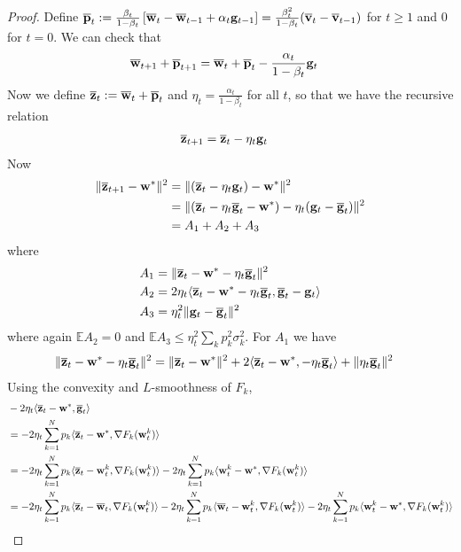 \begin{proof}
	Define ${\overline{\mathbf{p}}}_{t}:=\frac{\beta_{t}}{1-\beta_{t}}\left[{\overline{\mathbf{w}}}_{t}-{\overline{\mathbf{w}}}_{t-1}+\alpha_{t}{\mathbf{g}}_{t-1}\right]=\frac{\beta_{t}^{2}}{1-\beta_{t}}({\overline{\mathbf{v}}}_{t}-{\overline{\mathbf{v}}}_{t-1})$
	for $t\geq1$ and 0 for $t=0$. We can check that 
	\begin{align*}
	{\overline{\mathbf{w}}}_{t+1}+{\overline{\mathbf{p}}}_{t+1} & ={\overline{\mathbf{w}}}_{t}+{\overline{\mathbf{p}}}_{t}-\frac{\alpha_{t}}{1-\beta_{t}}{\mathbf{g}}_{t}
	\end{align*}
	Now we define ${\overline{\mathbf{z}}}_{t}:={\overline{\mathbf{w}}}_{t}+{\overline{\mathbf{p}}}_{t}$
	and $\eta_{t}=\frac{\alpha_{t}}{1-\beta_{t}}$ for all $t$, so that
	we have the recursive relation 
	\begin{align*}
	{\overline{\mathbf{z}}}_{t+1} & ={\overline{\mathbf{z}}}_{t}-\eta_{t}{\mathbf{g}}_{t}
	\end{align*}
	Now 
	\begin{align*}
	\|{\overline{\mathbf{z}}}_{t+1}-{\mathbf{w}}^{\ast}\|^{2} & =\|({\overline{\mathbf{z}}}_{t}-\eta_{t}{\mathbf{g}}_{t})-{\mathbf{w}}^{\ast}\|^{2}\\
	& =\|({\overline{\mathbf{z}}}_{t}-\eta_{t}{\overline{\mathbf{g}}}_{t}-{\mathbf{w}}^{\ast})-\eta_{t}({\mathbf{g}}_{t}-{\overline{\mathbf{g}}}_{t})\|^{2}\\
	& =A_{1}+A_{2}+A_{3}
	\end{align*}
	where 
	\begin{align*}
	A_{1} & =\|{\overline{\mathbf{z}}}_{t}-{\mathbf{w}}^{\ast}-\eta_{t}{\overline{\mathbf{g}}}_{t}\|^{2}\\
	A_{2} & =2\eta_{t}\langle{\overline{\mathbf{z}}}_{t}-{\mathbf{w}}^{\ast}-\eta_{t}{\overline{\mathbf{g}}}_{t},{\overline{\mathbf{g}}}_{t}-{\mathbf{g}}_{t}\rangle\\
	A_{3} & =\eta_{t}^{2}\|{\mathbf{g}}_{t}-{\overline{\mathbf{g}}}_{t}\|^{2}
	\end{align*}
	where again $\mathbb{E}A_{2}=0$ and $\mathbb{E}A_{3}\leq\eta_{t}^{2}\sum_{k}p_{k}^{2}\sigma_{k}^{2}$.
	For $A_{1}$ we have 
	\begin{align*}
	\|{\overline{\mathbf{z}}}_{t}-{\mathbf{w}}^{\ast}-\eta_{t}{\overline{\mathbf{g}}}_{t}\|^{2} & =\|{\overline{\mathbf{z}}}_{t}-{\mathbf{w}}^{\ast}\|^{2}+2\langle{\overline{\mathbf{z}}}_{t}-{\mathbf{w}}^{\ast},-\eta_{t}{\overline{\mathbf{g}}}_{t}\rangle+\|\eta_{t}{\overline{\mathbf{g}}}_{t}\|^{2}
	\end{align*}
	Using the convexity and $L$-smoothness of $F_{k}$, 
	\begin{align*}
	& -2\eta_{t}\langle\ov{z}_{t}-\vw^{\ast},\ov{g}_{t}\rangle\\
	& =-2\eta_{t}\sum_{k=1}^{N}p_{k}\langle\ov{z}_{t}-\vw^{\ast},\nabla F_{k}(\vw_{t}^{k})\rangle\\
	& =-2\eta_{t}\sum_{k=1}^{N}p_{k}\langle\ov{z}_{t}-\vw_{t}^{k},\nabla F_{k}(\vw_{t}^{k})\rangle-2\eta_{t}\sum_{k=1}^{N}p_{k}\langle \vw_{t}^{k}-\vw^{\ast},\nabla F_{k}(\vw_{t}^{k})\rangle\\
	& =-2\eta_{t}\sum_{k=1}^{N}p_{k}\langle\ov{z}_{t}-\ov{w}_{t},\nabla F_{k}(\vw_{t}^{k})\rangle-2\eta_{t}\sum_{k=1}^{N}p_{k}\langle\ov{w}_{t}-\vw_{t}^{k},\nabla F_{k}(\vw_{t}^{k})\rangle-2\eta_{t}\sum_{k=1}^{N}p_{k}\langle \vw_{t}^{k}-\vw^{\ast},\nabla F_{k}(\vw_{t}^{k})\rangle\\

\end{align*}
\end{proof}

